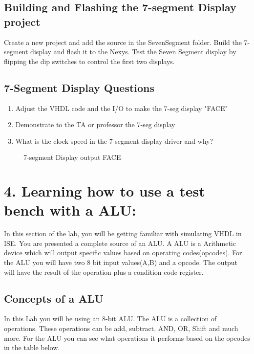 \documentclass{article}
\begin{document}
\subsection{Building and Flashing the 7-segment Display project}
Create a new project and add the source in the SevenSegment folder. Build the 7-segment display and flash it to the Nexys. Test the Seven Segment display by flipping the dip switches to control the first two displays.

\subsection{7-Segment Display Questions}

\begin{enumerate}
  \item Adjust the VHDL code and the I/O to make the 7-seg display "FACE"
  \item Demonstrate to the TA or professor the 7-seg display
  \item What is the clock speed in the 7-segment display driver and why?
\end{enumerate}

\begin{figure}[!htb]
  \centering
  \caption{7-segment Display output FACE}
\end{figure}

\newpage

\section{4. Learning how to use a test bench with a ALU:}
In this section of the lab, you will be getting familiar with simulating VHDL in ISE. You are presented a complete source of an ALU. A ALU is a Arithmetic device which will output specific values based on operating codes(opcodes). For the ALU you will have two 8 bit input values(A,B) and a opcode. The output will have the result of the operation plus a condition code register.
\subsection{Concepts of a ALU}
In this Lab you will be using an 8-bit ALU. The ALU is a collection of operations. These operations can be add, subtract, AND, OR, Shift and much more. For the ALU you can see what operations it performs based on the opcodes in the table below.
\end{document}

